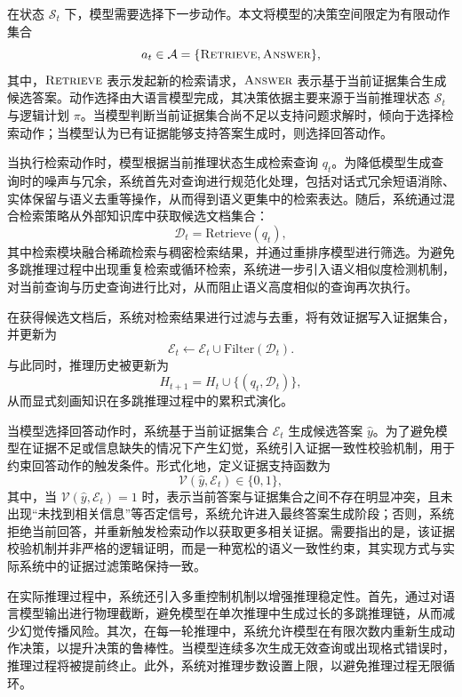 在状态 $\mathcal{S}_t$ 下，模型需要选择下一步动作。本文将模型的决策空间限定为有限动作集合
\begin{equation}
a_t \in \mathcal{A} = \{\textsc{Retrieve}, \textsc{Answer}\},
\end{equation}
其中，$\textsc{Retrieve}$ 表示发起新的检索请求，$\textsc{Answer}$ 表示基于当前证据集合生成候选答案。动作选择由大语言模型完成，其决策依据主要来源于当前推理状态 $\mathcal{S}_t$ 与逻辑计划 $\pi$。当模型判断当前证据集合尚不足以支持问题求解时，倾向于选择检索动作；当模型认为已有证据能够支持答案生成时，则选择回答动作。

当执行检索动作时，模型根据当前推理状态生成检索查询 $q_t$。为降低模型生成查询时的噪声与冗余，系统首先对查询进行规范化处理，包括对话式冗余短语消除、实体保留与语义去重等操作，从而得到语义更集中的检索表达。随后，系统通过混合检索策略从外部知识库中获取候选文档集合：
\begin{equation}
\mathcal{D}_t = \mathrm{Retrieve}(q_t),
\end{equation}
其中检索模块融合稀疏检索与稠密检索结果，并通过重排序模型进行筛选。为避免多跳推理过程中出现重复检索或循环检索，系统进一步引入语义相似度检测机制，对当前查询与历史查询进行比对，从而阻止语义高度相似的查询再次执行。

在获得候选文档后，系统对检索结果进行过滤与去重，将有效证据写入证据集合，并更新为
\begin{equation}
\mathcal{E}_t \leftarrow \mathcal{E}_t \cup \mathrm{Filter}(\mathcal{D}_t).
\end{equation}
与此同时，推理历史被更新为
\begin{equation}
H_{t+1} = H_t \cup \{(q_t, \mathcal{D}_t)\},
\end{equation}
从而显式刻画知识在多跳推理过程中的累积式演化。

当模型选择回答动作时，系统基于当前证据集合 $\mathcal{E}_t$ 生成候选答案 $\hat{y}$。为了避免模型在证据不足或信息缺失的情况下产生幻觉，系统引入证据一致性校验机制，用于约束回答动作的触发条件。形式化地，定义证据支持函数为
\begin{equation}
\mathcal{V}(\hat{y}, \mathcal{E}_t) \in \{0,1\},
\end{equation}
其中，当 $\mathcal{V}(\hat{y}, \mathcal{E}_t)=1$ 时，表示当前答案与证据集合之间不存在明显冲突，且未出现“未找到相关信息”等否定信号，系统允许进入最终答案生成阶段；否则，系统拒绝当前回答，并重新触发检索动作以获取更多相关证据。需要指出的是，该证据校验机制并非严格的逻辑证明，而是一种宽松的语义一致性约束，其实现方式与实际系统中的证据过滤策略保持一致。

在实际推理过程中，系统还引入多重控制机制以增强推理稳定性。首先，通过对语言模型输出进行物理截断，避免模型在单次推理中生成过长的多跳推理链，从而减少幻觉传播风险。其次，在每一轮推理中，系统允许模型在有限次数内重新生成动作决策，以提升决策的鲁棒性。当模型连续多次生成无效查询或出现格式错误时，推理过程将被提前终止。此外，系统对推理步数设置上限，以避免推理过程无限循环。


